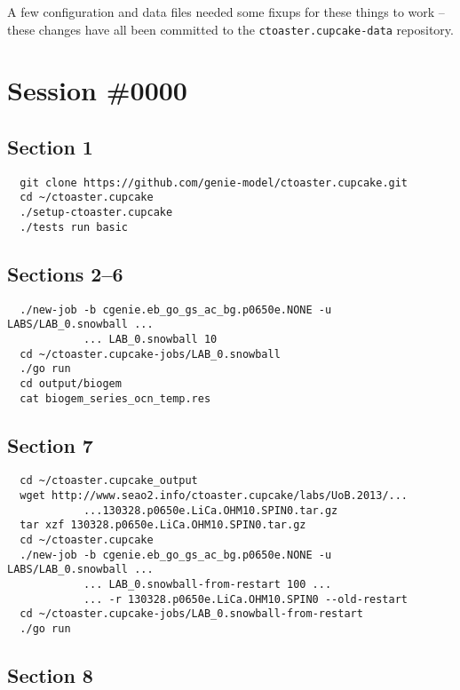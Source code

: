 \documentclass[a4paper,10pt,article]{memoir}
\begin{document}
A few configuration and data files needed some fixups for these things
to work -- these changes have all been committed to the
\texttt{ctoaster.cupcake-data} repository.

\section{Session \#0000}

\subsection*{Section 1}

\begin{verbatim}
  git clone https://github.com/genie-model/ctoaster.cupcake.git
  cd ~/ctoaster.cupcake
  ./setup-ctoaster.cupcake
  ./tests run basic
\end{verbatim}

\subsection*{Sections 2--6}

\begin{verbatim}
  ./new-job -b cgenie.eb_go_gs_ac_bg.p0650e.NONE -u LABS/LAB_0.snowball ...
            ... LAB_0.snowball 10
  cd ~/ctoaster.cupcake-jobs/LAB_0.snowball
  ./go run
  cd output/biogem
  cat biogem_series_ocn_temp.res
\end{verbatim}

\subsection*{Section 7}

\begin{verbatim}
  cd ~/ctoaster.cupcake_output
  wget http://www.seao2.info/ctoaster.cupcake/labs/UoB.2013/...
            ...130328.p0650e.LiCa.OHM10.SPIN0.tar.gz
  tar xzf 130328.p0650e.LiCa.OHM10.SPIN0.tar.gz
  cd ~/ctoaster.cupcake
  ./new-job -b cgenie.eb_go_gs_ac_bg.p0650e.NONE -u LABS/LAB_0.snowball ...
            ... LAB_0.snowball-from-restart 100 ...
            ... -r 130328.p0650e.LiCa.OHM10.SPIN0 --old-restart
  cd ~/ctoaster.cupcake-jobs/LAB_0.snowball-from-restart
  ./go run
\end{verbatim}

\subsection*{Section 8}
\end{document}

